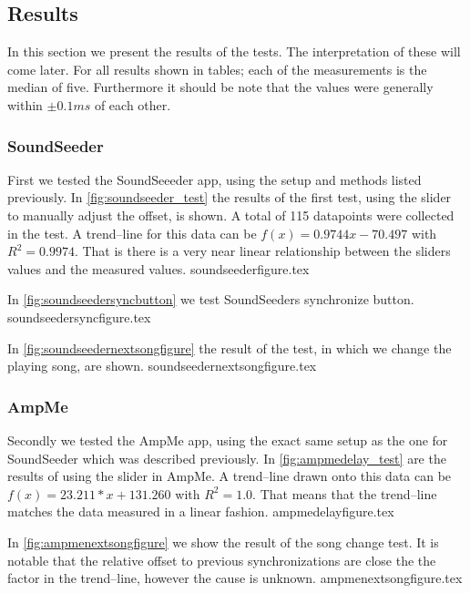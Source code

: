\subsection{Results}
In this section we present the results of the tests.
The interpretation of these will come later.
For all results shown in tables; each of the measurements is the median of five. 
Furthermore it should be note that the values were generally within $\pm 0.1 ms$ of each other. 

\subsubsection{SoundSeeder}
First we tested the SoundSeeeder app, using the setup and methods listed previously. 
In \vref{fig:soundseeder_test} the results of the first test, using the slider to manually adjust the offset, is shown. 
A total of 115 datapoints were collected in the test.
A trend--line for this data can be $f(x) = 0.9744x - 70.497$ with $R^2=0.9974$.
That is there is a very near linear relationship between the sliders values and the measured values.
{soundseederfigure.tex}

In \vref{fig:soundseedersyncbutton} we test SoundSeeders synchronize button.
{soundseedersyncfigure.tex}

In \vref{fig:soundseedernextsongfigure} the result of the test, in which we change the playing song, are shown. 
{soundseedernextsongfigure.tex}

\subsubsection{AmpMe}
Secondly we tested the AmpMe app, using the exact same setup as the one for SoundSeeder which was described previously. 
In \vref{fig:ampmedelay_test} are the results of using the slider in AmpMe.
A trend--line drawn onto this data can be $f(x) = 23.211 * x + 131.260$ with $R^2 = 1.0$.
That means that the trend--line matches the data measured in a linear fashion. 
{ampmedelayfigure.tex}

In \vref{fig:ampmenextsongfigure} we show the result of the song change test. 
It is notable that the relative offset to previous synchronizations are close the the factor in the trend--line, however the cause is unknown. 
{ampmenextsongfigure.tex}

